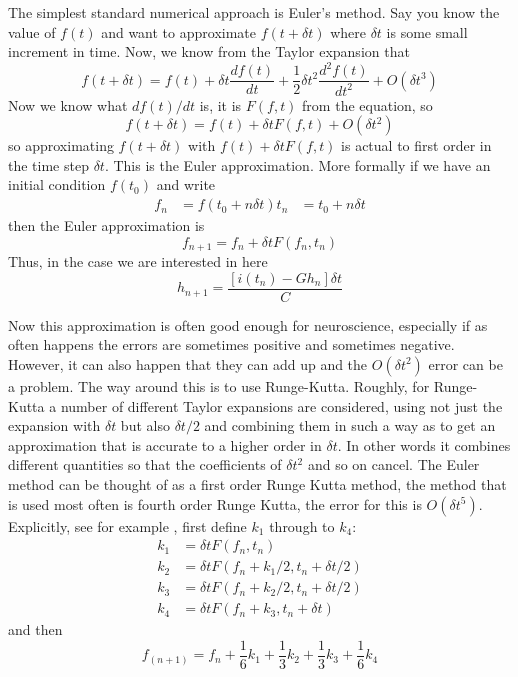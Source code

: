 \documentclass[11pt,a4paper]{scrartcl}
\begin{document}
The simplest standard numerical approach is Euler's method. Say you
know the value of $f(t)$ and want to approximate $f(t+\delta t)$ where
$\delta t$ is some small increment in time. Now, we know from the
Taylor expansion that
\begin{equation}
f(t+\delta t)=f(t)+\delta t \frac{df(t)}{dt}+\frac{1}{2}\delta t^2 \frac{d^2f(t)}{dt^2}+O(\delta t^3)
\end{equation}
Now we know what $df(t)/dt$ is, it is $F(f,t)$ from the equation, so 
\begin{equation}
f(t+\delta t)=f(t)+\delta t F(f,t) + O(\delta t^2)
\end{equation}
so approximating $f(t+\delta t)$ with $f(t)+\delta t F(f,t)$ is actual
to first order in the time step $\delta t$. This is the Euler
approximation. More formally if we have an initial condition $f(t_0)$
and write
\begin{align}
f_n&=f(t_0+n\delta t)
t_n&=t_0+n\delta t
\end{align}
then the Euler approximation is
\begin{equation}
f_{n+1}=f_n+\delta t F(f_n,t_n)
\end{equation}
Thus, in the case we are interested in here
\begin{equation}
h_{n+1}=\frac{[i(t_n)-Gh_n]\delta t}{C}
\end{equation}

Now this approximation is often good enough for neuroscience,
especially if as often happens the errors are sometimes positive and
sometimes negative. However, it can also happen that they can add up
and the $O(\delta t^2)$ error can be a problem. The way around this is
to use Runge-Kutta. Roughly, for Runge-Kutta a number of different
Taylor expansions are considered, using not just the expansion with
$\delta t$ but also $\delta t /2$ and combining them in such a way as
to get an approximation that is accurate to a higher order in 
$\delta t$. In other words it combines different quantities so that the
coefficients of $\delta t^2$ and so on cancel. The Euler method can be
thought of as a first order Runge Kutta method, the method that is
used most often is fourth order Runge Kutta, the error for this is
$O(\delta t^5)$. Explicitly, see for example \cite{}, first define
$k_1$ through to $k_4$:
\begin{align}
k_1&=\delta t F(f_n,t_n)\\	
k_2&=\delta t F(f_n+k_1/2,t_n+\delta t/2)\\	
k_3&=\delta t F(f_n+k_2/2,t_n+\delta t/2)\\	
k_4&=\delta t F(f_n+k_3,t_n+\delta t)	
\end{align}
and then
\begin{equation}
f_(n+1)	=f_n+\frac{1}{6}k_1+\frac{1}{3}k_2+\frac{1}{3}k_3+\frac{1}{6}k_4
\end{equation}
\end{document}
